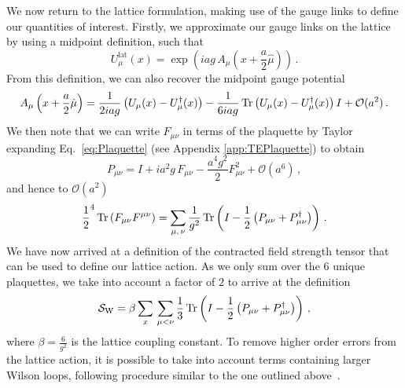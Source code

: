 We now return to the lattice formulation, making use of the gauge links to define our quantities of interest. Firstly, we approximate our gauge links on the lattice by using a midpoint definition, such that
\begin{equation}
U_\mu^\text{lat}(x) = \exp\left(iag\, A_\mu\left(x+\frac{a}{2}\hat{\mu}\right)\right)\, .
\label{eq:GaugeLinkLat}
\end{equation}
From this definition, we can also recover the midpoint gauge potential~\cite{Leinweber:1998im,Alles:1996ka}
\begin{equation}
A_\mu\left(x+\frac{a}{2}\hat{\mu}\right) = \frac{1}{2iag}\left(U_\mu(x) - U_\mu^\dag(x)\right) - \frac{1}{6iag}\operatorname{Tr}\left(U_\mu(x) - U_\mu^\dag(x)\right)I + \mathcal{O}(a^2)\, .
\label{eq:GaugePotentialLat}
\end{equation}
We then note that we can write $F_{\mu\nu}$ in terms of the plaquette by Taylor expanding Eq.~\ref{eq:Plaquette} (see Appendix \ref{app:TEPlaquette}) to obtain~\cite{Gupta:1997nd}
%
\begin{equation}
P_{\mu\nu} = I+ia^2g\, F_{\mu\nu} - \frac{a^4 g^2}{2}F^2_{\mu\nu} +\mathcal{O}(a^6)\, ,
\label{eq:PlaquetteExpansion}
\end{equation} 
%
and hence to $\mathcal{O}(a^2)$
%
\begin{align}
\frac{1}{2}^4\operatorname{Tr}\left(F_{\mu\nu}F^{\mu\nu}\right) = \sum_{\mu,\,\nu}\frac{1}{g^2}\operatorname{Tr}\left(I-\frac{1}{2}\left(P_{\mu\nu}+P_{\mu\nu}^\dag\right)\right)\, .
\label{eq:FieldStrengthPlaquette}
\end{align}
%
We have now arrived at a definition of the contracted field strength tensor that can be used to define our lattice action. As we only sum over the 6 unique plaquettes, we take into account a factor of $2$ to arrive at the definition 
%
\begin{equation}
\mathcal{S}_\text{W} = \beta\sum_x\,\sum_{\mu<\nu} \frac{1}{3}\operatorname{Tr}\left(I-\frac{1}{2}\left(P_{\mu\nu}+P_{\mu\nu}^\dag\right)\right)\, ,
\label{eq:WilsonAction}
\end{equation}
%
where $\beta = \frac{6}{g^2}$ is the lattice coupling constant. To remove higher order errors from the lattice action, it is possible to take into account terms containing larger Wilson loops, following procedure similar to the one outlined above~\cite{Alford:1995hw,Symanzik:1983dc,Symanzik:1983gh}.\\

